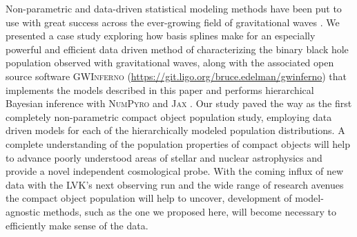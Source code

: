 Non-parametric and data-driven statistical modeling methods have been put to use with great success across the ever-growing field of gravitational 
waves \citep{B_Farr_etal_2014,Littenberg_2015,Mandel_2016,Edwards_2018,Doctor_GPR,Edelman_2021,Vitale_2021,Tiwari_2021_a,Tiwari_2021_b,Edelman_2022ApJ,Tiwari_2022ApJ}. 
We presented a case study exploring how basis splines make for an especially powerful and efficient data driven method of characterizing the binary black hole population observed 
with gravitational waves, along with the associated open source software \textsc{GWInferno} (\url{https://git.ligo.org/bruce.edelman/gwinferno}) that implements the models 
described in this paper and performs hierarchical Bayesian inference with \textsc{NumPyro} and \textsc{Jax} \citep{pyro,numpyro,jax}. 
Our study paved the way as the first completely non-parametric compact object population study, employing data driven models for each of the hierarchically 
modeled population distributions. A complete understanding of the population properties of compact objects will help to advance poorly understood areas of stellar and 
nuclear astrophysics and provide a novel independent cosmological probe. With the coming influx of new data with the LVK's next observing run and the wide 
range of research avenues the compact object population will help to uncover, development of model-agnostic methods, such as the one we proposed here, will become necessary to efficiently make
sense of the data.